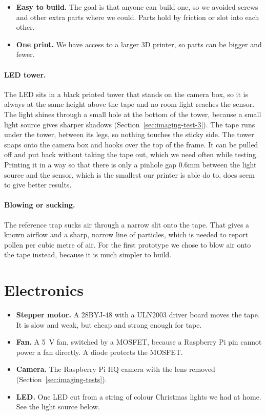 \begin{itemize}
  \item \textbf{Easy to build.} The goal is that anyone can build one, so we avoided screws
  and other extra parts where we could. Parts hold by friction or slot into each other.
  \item \textbf{One print.} We have access to a larger 3D printer, so parts can be bigger and
  fewer.
\end{itemize}

\paragraph{LED tower.}
The LED sits in a black printed tower that stands on the camera box, so it is always at the same
height above the tape and no room light reaches the sensor. The light shines through a small
hole at the bottom of the tower, because a small light source gives sharper shadows
(Section~\ref{sec:imaging-test-3}). The tape runs under the tower, between its legs, so nothing
touches the sticky side. The tower snaps onto the camera box and hooks over the top of the frame.
It can be pulled off and put back without taking the tape out, which we need often while testing.
Printing it in a way so that there is only a pinhole gap 0.6mm between the light source and the
sensor, which is the smallest our printer is able do to, does seem to give better results.

\paragraph{Blowing or sucking.}
The reference trap sucks air through a narrow slit onto the tape. That gives a known airflow
and a sharp, narrow line of particles, which is needed to report pollen per cubic metre of air.
For the first prototype we chose to blow air onto the tape instead, because it is much simpler
to build. 

\section{Electronics}\label{sec:electronics}

\begin{itemize}
  \item \textbf{Stepper motor.} A 28BYJ-48 with a ULN2003 driver board moves the tape. It is
  slow and weak, but cheap and strong enough for tape.
  \item \textbf{Fan.} A 5~V fan, switched by a MOSFET, because a Raspberry Pi pin cannot power a
  fan directly. A diode protects the MOSFET.
  \item \textbf{Camera.} The Raspberry Pi HQ camera with the lens removed
  (Section~\ref{sec:imaging-tests}).
  \item \textbf{LED.} One LED cut from a string of colour Christmas lights we had at home.
  See the light source below.
\end{itemize}


